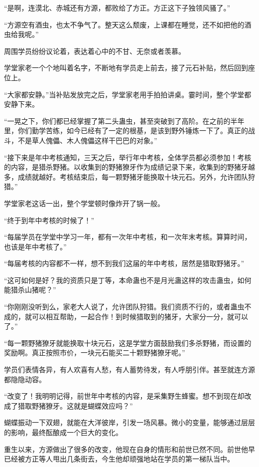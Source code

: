 \begin{this_body}
“是啊，连漠北、赤城还有方源，都败给了方正。方正这下子独领风骚了。”

“方源空有酒虫，也太不争气了。整天这么颓废，上课都在睡觉，还不如把他的酒虫给我呢。”

周围学员纷纷议论着，表达着心中的不甘、无奈或者羡慕。

学堂家老一个个地叫着名字，不断地有学员走上前去，接了元石补贴，然后回到座位上。

“大家都安静。”当补贴发放完之后，学堂家老用手拍拍讲桌。霎时间，整个学堂都安静下来。

“一晃之下，你们都已经掌握了第二头蛊虫，甚至突破到了高阶。在之前的半年里，你们勤学苦练，如今已经有了一定的根基，是该到野外锤炼一下了。真正的战斗，不是草人傀儡、木人傀儡这样干巴巴的对象。”

“接下来是年中考核通知，三天之后，举行年中考核，全体学员都必须参加！考核的内容，是猎杀野猪。以收集到的野猪獠牙作为成绩记录下来，收集到的野猪牙越多，成绩就越好。考核结束后，每一颗野猪牙能换取十块元石。另外，允许团队狩猎。”

学堂家老这话一出，整个学堂顿时像炸开了锅一般。

“终于到年中考核的时候了！”

“每届学员在学堂中学习一年，都有一次年中考核，和一次年末考核。算算时间，也该是年中考核了。”

“每届考核的内容都不一样，想不到我们这届的年中考核，居然是猎取野猪牙。”

“这可如何是好？我的资质只是丁等，本命蛊也不是月光蛊这样的攻击蛊虫，如何能猎杀山猪呢？”

“你刚刚没听到么，家老大人说了，允许团队狩猎。我们资质不行的，或者蛊虫不成的，就可以相互帮助，一起合作！到时候猎取到的猪牙，大家分一分，就可以了。”

“每一颗野猪獠牙就能换取十块元石，这是学堂方面鼓励我们多杀野猪，而设置的奖励啊。真正按照市价，一块元石能买二十颗野猪獠牙呢。”

学员们表情各异，有人欢喜有人愁，有人蓄势待发，有人呼朋引伴。甚至就连方源都隐隐动容。

“改变了！我明明记得，前世年中考核的内容，是采集野生蜂蜜。想不到现在却改成了猎取野猪獠牙。这就是蝴蝶效应吗？”

蝴蝶振动一下双翅，就能在大洋彼岸，引发一场风暴。微小的变量，能够通过层层的影响，最终酝酿成一个巨大的变化。

重生以来，方源做出了很多的改变，他现在自身的情形和前世已然不同。前世他早已经被方正等人甩出几条街去，今生他却顽强地站在学员的第一梯队当中。


\end{this_body}
